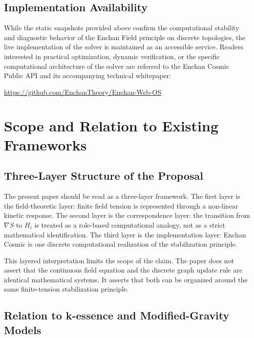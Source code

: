 \documentclass[11pt,a4paper]{article}
\begin{document}
\clearpage

\subsection{Implementation Availability}

While the static snapshots provided above confirm the computational stability and diagnostic behavior of the Enchan Field principle on discrete topologies, the live implementation of the solver is maintained as an accessible service. Readers interested in practical optimization, dynamic verification, or the specific computational architecture of the solver are referred to the Enchan Cosmic Public API and its accompanying technical whitepaper:
\begin{center}
    \url{https://github.com/EnchanTheory/Enchan-Web-OS}
\end{center}

\clearpage

\section{Scope and Relation to Existing Frameworks}

\subsection{Three-Layer Structure of the Proposal}

The present paper should be read as a three-layer framework. The first layer is the field-theoretic layer: finite field tension is represented through a non-linear kinetic response. The second layer is the correspondence layer: the transition from $\nabla S$ to $H_i$ is treated as a role-based computational analogy, not as a strict mathematical identification. The third layer is the implementation layer: Enchan Cosmic is one discrete computational realization of the stabilization principle.

This layered interpretation limits the scope of the claim. The paper does not assert that the continuous field equation and the discrete graph update rule are identical mathematical systems. It asserts that both can be organized around the same finite-tension stabilization principle.

\subsection{Relation to k-essence and Modified-Gravity Models}
\end{document}
